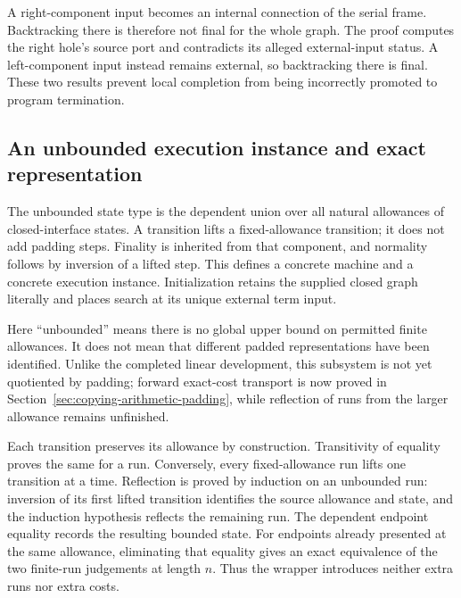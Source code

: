 A right-component input becomes an internal connection of the serial
frame. Backtracking there is therefore not final for the whole graph.
The proof computes the right hole's source port and contradicts its alleged
external-input status. A left-component input instead remains external,
so backtracking there is final. These two results prevent local completion
from being incorrectly promoted to program termination.



\subsection{An unbounded execution instance and exact representation}

The unbounded state type is the dependent union over all natural allowances
of closed-interface states. A transition lifts a fixed-allowance transition;
it does not add padding steps. Finality is inherited from that component,
and normality follows by inversion of a lifted step. This defines a concrete
machine and a concrete execution instance. Initialization retains the supplied
closed graph literally and places search at its unique external term input.

Here ``unbounded'' means there is no global upper bound on permitted finite
allowances. It does not mean that different padded representations have been
identified. Unlike the completed linear development, this subsystem is not
yet quotiented by padding; forward exact-cost transport is now proved in
Section~\ref{sec:copying-arithmetic-padding}, while reflection of runs from
the larger allowance remains unfinished.






Each transition preserves its allowance by construction. Transitivity
of equality proves the same for a run. Conversely, every fixed-allowance run
lifts one transition at a time. Reflection is proved by induction on an
unbounded run: inversion of its first lifted transition identifies the source
allowance and state, and the induction hypothesis reflects the remaining run.
The dependent endpoint equality records the resulting bounded state. For
endpoints already presented at the same allowance, eliminating that equality
gives an exact equivalence of the two finite-run judgements at length $n$.
Thus the wrapper introduces neither extra runs nor extra costs.

